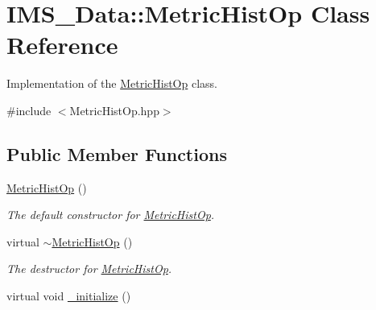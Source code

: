\hypertarget{classIMS__Data_1_1MetricHistOp}{
\section{IMS\_\-Data::MetricHistOp Class Reference}
\label{classIMS__Data_1_1MetricHistOp}
}


Implementation of the \hyperlink{classIMS__Data_1_1MetricHistOp}{MetricHistOp} class.  




{\ttfamily \#include $<$MetricHistOp.hpp$>$}

\subsection*{Public Member Functions}
\begin{DoxyCompactItemize}
\item 
\hypertarget{classIMS__Data_1_1MetricHistOp_a41cfef51f3429194a18542b26ac24720}{
\hyperlink{classIMS__Data_1_1MetricHistOp_a41cfef51f3429194a18542b26ac24720}{MetricHistOp} ()}
\label{classIMS__Data_1_1MetricHistOp_a41cfef51f3429194a18542b26ac24720}

\begin{DoxyCompactList}\small\item\em The default constructor for \hyperlink{classIMS__Data_1_1MetricHistOp}{MetricHistOp}. \item\end{DoxyCompactList}\item 
\hypertarget{classIMS__Data_1_1MetricHistOp_a9d39ad72e022860df82629999137f085}{
virtual \hyperlink{classIMS__Data_1_1MetricHistOp_a9d39ad72e022860df82629999137f085}{$\sim$MetricHistOp} ()}
\label{classIMS__Data_1_1MetricHistOp_a9d39ad72e022860df82629999137f085}

\begin{DoxyCompactList}\small\item\em The destructor for \hyperlink{classIMS__Data_1_1MetricHistOp}{MetricHistOp}. \item\end{DoxyCompactList}\item 
\hypertarget{classIMS__Data_1_1MetricHistOp_ae798398daf66bb07e6e4c23f2ae88255}{
virtual void \hyperlink{classIMS__Data_1_1MetricHistOp_ae798398daf66bb07e6e4c23f2ae88255}{\_\-initialize} ()}
\label{classIMS__Data_1_1MetricHistOp_ae798398daf66bb07e6e4c23f2ae88255}


\end{DoxyCompactItemize}
